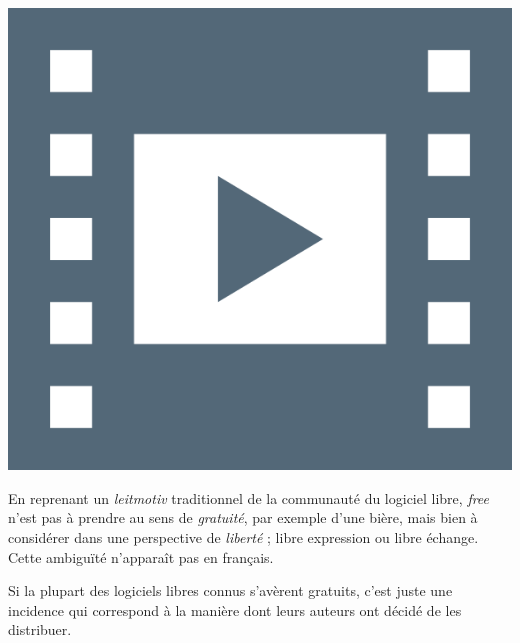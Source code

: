 \begin{marginvideo}
	[\label{vid:I.7}Logiciels libres I.]%
	\href{https://www.youtube.com/watch?v=BcUaMIbQNLI&list=PLWvGMqXvyJAMNWRvODUB5Ry3licACdaa0&index=9}%
	  {\includegraphics[width=\marginparwidth]{./Images/Pictograms/film-strip-dark-electric-blue.png}}%
\end{marginvideo}

En reprenant un \textit{leitmotiv} traditionnel de la communauté du logiciel libre, \textit{free} n'est pas à prendre au sens de \emph{gratuité}, par exemple d'une bière, mais bien à considérer dans une perspective de \emph{liberté} ; libre expression ou libre échange. Cette ambiguïté n'apparaît pas en français.

Si la plupart des logiciels libres connus s'avèrent gratuits, c'est juste une incidence qui correspond à la manière dont leurs auteurs ont décidé de les distribuer. 

